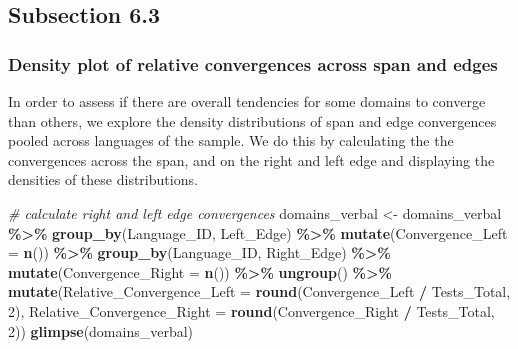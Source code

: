 \documentclass[
]{article}
\newenvironment{Shaded}{\begin{snugshade}}{\end{snugshade}}
\newcommand{\AttributeTok}[1]{\textcolor[rgb]{0.13,0.29,0.53}{#1}}
\newcommand{\CommentTok}[1]{\textcolor[rgb]{0.56,0.35,0.01}{\textit{#1}}}
\newcommand{\DecValTok}[1]{\textcolor[rgb]{0.00,0.00,0.81}{#1}}
\newcommand{\FunctionTok}[1]{\textcolor[rgb]{0.13,0.29,0.53}{\textbf{#1}}}
\newcommand{\NormalTok}[1]{#1}
\newcommand{\OtherTok}[1]{\textcolor[rgb]{0.56,0.35,0.01}{#1}}
\newcommand{\SpecialCharTok}[1]{\textcolor[rgb]{0.81,0.36,0.00}{\textbf{#1}}}
\begin{document}
\subsection{Subsection 6.3}\label{subsection-6.3}

\subsubsection{Density plot of relative convergences across span and
edges}\label{density-plot-of-relative-convergences-across-span-and-edges}

In order to assess if there are overall tendencies for some domains to
converge than others, we explore the density distributions of span and
edge convergences pooled across languages of the sample. We do this by
calculating the the convergences across the span, and on the right and
left edge and displaying the densities of these distributions.

\begin{Shaded}
\begin{Highlighting}[]
\CommentTok{\# calculate right and left edge convergences}
\NormalTok{domains\_verbal }\OtherTok{\textless{}{-}}\NormalTok{ domains\_verbal }\SpecialCharTok{\%\textgreater{}\%}
  \FunctionTok{group\_by}\NormalTok{(Language\_ID, Left\_Edge) }\SpecialCharTok{\%\textgreater{}\%}
  \FunctionTok{mutate}\NormalTok{(}\AttributeTok{Convergence\_Left =} \FunctionTok{n}\NormalTok{()) }\SpecialCharTok{\%\textgreater{}\%}
  \FunctionTok{group\_by}\NormalTok{(Language\_ID, Right\_Edge) }\SpecialCharTok{\%\textgreater{}\%}
  \FunctionTok{mutate}\NormalTok{(}\AttributeTok{Convergence\_Right =} \FunctionTok{n}\NormalTok{()) }\SpecialCharTok{\%\textgreater{}\%}
  \FunctionTok{ungroup}\NormalTok{() }\SpecialCharTok{\%\textgreater{}\%}
  \FunctionTok{mutate}\NormalTok{(}\AttributeTok{Relative\_Convergence\_Left =} \FunctionTok{round}\NormalTok{(Convergence\_Left }\SpecialCharTok{/}\NormalTok{ Tests\_Total, }\DecValTok{2}\NormalTok{), }\AttributeTok{Relative\_Convergence\_Right =} \FunctionTok{round}\NormalTok{(Convergence\_Right }\SpecialCharTok{/}\NormalTok{ Tests\_Total, }\DecValTok{2}\NormalTok{))}
\FunctionTok{glimpse}\NormalTok{(domains\_verbal)}
\end{Highlighting}
\end{Shaded}
\end{document}
